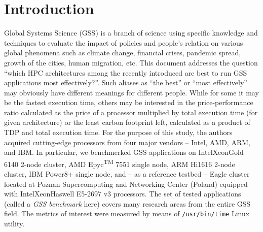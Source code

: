 \section*{Introduction}
\label{sec:intro}
Global Systems Science (GSS) is a branch of science using specific knowledge and techniques to evaluate the impact of policies and people's relation on various global phenomena such as climate change, financial crises, pandemic spread, growth of the cities, human migration, etc. This document addresses the question ``which HPC architectures among the recently introduced are best to run GSS applications most effectively?''. Such aliases as ``the best'' or ``most effectively'' may obviously have different meanings for different people. While for some it may be the fastest execution time, others may be interested in the price-performance ratio calculated as the price of a processor multiplied by total execution time (for given architecture) or the least carbon footprint left, calculated as a product of TDP and total execution time.
For the purpose of this study, the authors acquired cutting-edge processors from four major vendors -- Intel, AMD, ARM, and IBM. In particular, we benchmerked GSS applications on Intel\textregistered Xeon\textregistered Gold 6140 \cite{INTELXEONGOLD6140} 2-node cluster, AMD Epyc\textsuperscript{TM} 7551 single node, ARM Hi1616 2-node cluster, IBM Power8+ \cite{IBMPOWER8} single node, and -- as a reference testbed -- Eagle cluster located at Poznan Supercomputing and Networking Center (Poland) equipped with Intel\textregistered  Xeon\textregistered Haswell E5-2697 v3 processors.
The set of tested applications (called a \textit{GSS benchmark} here) covers many research areas from the entire GSS field.
The metrics of interest were measured by means of \texttt{/usr/bin/time} Linux utility.
